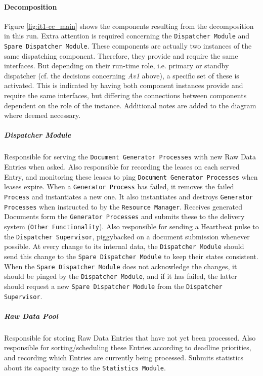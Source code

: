 \documentclass[a4paper,10pt]{article}
\begin{document}
\paragraph{Decomposition}
Figure \ref{fig:it1-cc_main} shows the components resulting from the decomposition in this run. Extra attention is required concerning the \texttt{Dispatcher Module} and \texttt{Spare Dispatcher Module}. These components are actually two instances of the same dispatching component. Therefore, they provide and require the same interfaces. But depending on their run-time role, i.e. primary or standby dispatcher (cf. the decisions concerning \emph{Av1} above), a specific set of these is activated. This is indicated by having both component instances provide and require the same interfaces, but differing the connections between components dependent on the role of the instance. Additional notes are added to the diagram where deemed necessary.

\subparagraph{Dispatcher Module}
Responsible for serving the \texttt{Document Generator Processes} with new Raw Data Entries when asked. Also responsible for recording the leases on each served Entry, and monitoring these leases to ping \texttt{Document Generator Processes} when leases expire. When a \texttt{Generator Process} has failed, it removes the failed \texttt{Process} and instantiates a new one. It also instantiates and destroys \texttt{Generator Processes} when instructed to by the \texttt{Resource Manager}. Receives generated Documents form the \texttt{Generator Processes} and submits these to the delivery system (\texttt{Other Functionality}). Also responsible for sending a Heartbeat pulse to the \texttt{Dispatcher Supervisor}, piggybacked on a document submission whenever possible. At every change to its internal data, the \texttt{Dispatcher Module} should send this change to the \texttt{Spare Dispatcher Module} to keep their states consistent. When the \texttt{Spare Dispatcher Module} does not acknowledge the changes, it should be pinged by the \texttt{Dispatcher Module}, and if it has failed, the latter should request a new \texttt{Spare Dispatcher Module} from the \texttt{Dispatcher Supervisor}.

\subparagraph{Raw Data Pool}
Responsible for storing Raw Data Entries that have not yet been processed. Also responsible for sorting/scheduling these Entries according to deadline priorities, and recording which Entries are currently being processed. Submits statistics about its capacity usage to the \texttt{Statistics Module}.
\end{document}
